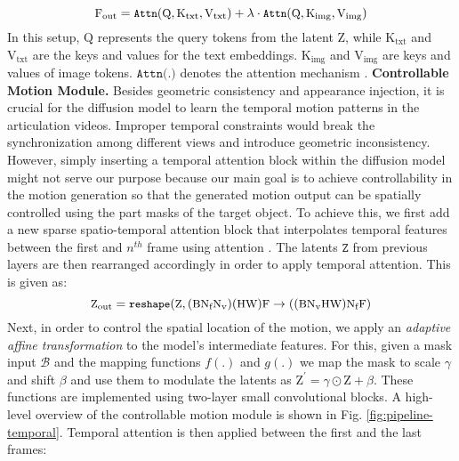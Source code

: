 \begin{equation}
\small
{\text{F}}_{\text{out}} = \texttt{Attn}(\text{Q}, \text{K}_{\text{txt}}, \text{V}_{\text{txt}}) + \lambda \cdot \texttt{Attn}(\text{Q}, \text{K}_{\text{img}}, \text{V}_{\text{img}})
\end{equation}
In this setup, $\text{Q}$ represents the query tokens from the latent $\text{Z}$, while $\text{K}_{\text{txt}}$ and $\text{V}_{\text{txt}}$ are the keys and values for the text embeddings. $\text{K}_{\text{img}}$ and $\text{V}_{\text{img}}$ are keys and values of image tokens. $\texttt{Attn(.)}$ denotes the attention mechanism \cite{vaswani2017attention}.
\noindent\textbf{Controllable Motion Module.} Besides geometric consistency and appearance injection, it is crucial for the diffusion model to learn the temporal motion patterns in the articulation videos. Improper temporal constraints would break the synchronization among different views and introduce geometric inconsistency. However, simply inserting a temporal attention block within the diffusion model might not serve our purpose because our main goal is to achieve controllability in the motion generation so that the generated motion output can be spatially controlled using the part masks of the target object. To achieve this, we first add a new sparse spatio-temporal attention block that interpolates temporal features between the first and $n^{th}$ frame using attention \cite{vaswani2017attention}. The latents $\texttt{Z}$ from previous layers are then rearranged accordingly in order to apply temporal attention. This is given as:
\begin{equation}
\small
\text{Z}_{\text{out}} = \texttt{reshape}(\text{Z}, (\text{B}\text{N}_{\text{f}}\text{N}_{\text{v}})(\text{H}\text{W})\text{F}  \rightarrow ((\text{B}\text{N}_{\text{v}}\text{H}\text{W})\text{N}_{\text{f}}\text{F})
\end{equation}
Next, in order to control the spatial location of the motion, we apply an \emph{adaptive affine transformation} to the model's intermediate features. For this, given a mask input $\mathcal{B}$ and the mapping functions $f(.)$ and $g(.)$ we map the mask to scale $\gamma$ and shift $\beta$ and use them to modulate the latents as $\text{Z}^{'} = \gamma \odot \text{Z} + \beta$. These functions are implemented using two-layer small convolutional blocks. A high-level overview of the controllable motion module is shown in Fig. \ref{fig:pipeline-temporal}. Temporal attention is then applied between the first and the last frames:

